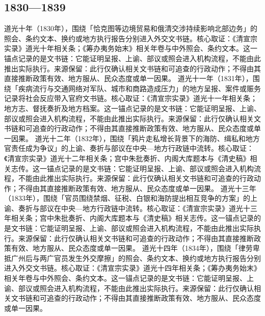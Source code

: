 \subsection{1830—1839}
道光十年（1830年），围绕「恰克图等边境贸易和俄清交涉持续影响北部边务」的照会、条约文本、换约或地方执行报告分别进入外交文书链。核心取证：《清宣宗实录》道光十年相关条；《筹办夷务始末》相关年卷与中外照会、条约文本。这一锚点记录的是文书链：它能证明呈报、上谕、部议或照会进入机构流程，不能由此推出实际执行。来源保留：此行仅确认相关文书链和可追查的行政动作；不得由其直接推断政策有效、地方服从、民众态度或单一因果。
道光十一年（1831年），围绕「疾病流行与交通网络对军队、城市和商路造成压力」的地方呈报、案件或赈务记录将社会反应带入官府文书链。核心取证：《清宣宗实录》道光十一年相关条；地方志、督抚奏折及地方档案。这一锚点记录的是文书链：它能证明呈报、上谕、部议或照会进入机构流程，不能由此推出实际执行。来源保留：此行仅确认相关文书链和可追查的行政动作；不得由其直接推断政策有效、地方服从、民众态度或单一因果。
道光十二年（1832年），围绕「鸦片走私增长背景下的海防、缉私和地方官责任成为争议」的上谕、奏折与部议在中央—地方行政链中流转。核心取证：《清宣宗实录》道光十二年相关条；宫中朱批奏折、内阁大库题本与《清史稿》相关志传。这一锚点记录的是文书链：它能证明呈报、上谕、部议或照会进入机构流程，不能由此推出实际执行。来源保留：此行仅确认相关文书链和可追查的行政动作；不得由其直接推断政策有效、地方服从、民众态度或单一因果。
道光十三年（1833年），围绕「官员围绕禁烟、征税、白银和海防提出相互竞争的方案」的上谕、奏折与部议在中央—地方行政链中流转。核心取证：《清宣宗实录》道光十三年相关条；宫中朱批奏折、内阁大库题本与《清史稿》相关志传。这一锚点记录的是文书链：它能证明呈报、上谕、部议或照会进入机构流程，不能由此推出实际执行。来源保留：此行仅确认相关文书链和可追查的行政动作；不得由其直接推断政策有效、地方服从、民众态度或单一因果。
道光十四年（1834年），围绕「律劳卑抵广州后与两广官员发生外交摩擦」的照会、条约文本、换约或地方执行报告分别进入外交文书链。核心取证：《清宣宗实录》道光十四年相关条；《筹办夷务始末》相关年卷与中外照会、条约文本。这一锚点记录的是文书链：它能证明呈报、上谕、部议或照会进入机构流程，不能由此推出实际执行。来源保留：此行仅确认相关文书链和可追查的行政动作；不得由其直接推断政策有效、地方服从、民众态度或单一因果。

